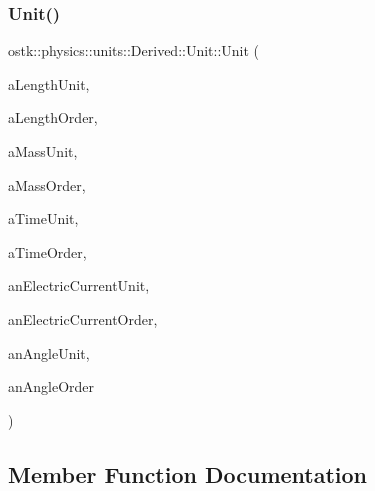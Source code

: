 \subsubsection{\texorpdfstring{Unit()}{Unit()}}
{\footnotesize\ttfamily ostk\+::physics\+::units\+::\+Derived\+::\+Unit\+::\+Unit (\begin{DoxyParamCaption}\item[{const \hyperlink{classostk_1_1physics_1_1units_1_1_length_a2664470a7eedf5d45c88861fe69badea}{Length\+::\+Unit} \&}]{a\+Length\+Unit,  }\item[{const \hyperlink{classostk_1_1physics_1_1units_1_1_derived_1_1_order}{Order} \&}]{a\+Length\+Order,  }\item[{const \hyperlink{classostk_1_1physics_1_1units_1_1_mass_aa8994892478fdbe6dc78d4bca08db0fa}{Mass\+::\+Unit} \&}]{a\+Mass\+Unit,  }\item[{const \hyperlink{classostk_1_1physics_1_1units_1_1_derived_1_1_order}{Order} \&}]{a\+Mass\+Order,  }\item[{const \hyperlink{classostk_1_1physics_1_1units_1_1_time_aa961f0dbca7ec297e19e15e0dfa3bb4a}{Time\+::\+Unit} \&}]{a\+Time\+Unit,  }\item[{const \hyperlink{classostk_1_1physics_1_1units_1_1_derived_1_1_order}{Order} \&}]{a\+Time\+Order,  }\item[{const \hyperlink{classostk_1_1physics_1_1units_1_1_electric_current_ac57c87a7533dc73b87185b0d9ae6985b}{Electric\+Current\+::\+Unit} \&}]{an\+Electric\+Current\+Unit,  }\item[{const \hyperlink{classostk_1_1physics_1_1units_1_1_derived_1_1_order}{Order} \&}]{an\+Electric\+Current\+Order,  }\item[{const \hyperlink{classostk_1_1physics_1_1units_1_1_angle_aea1f8018b1d378b9dee56959d8eb9def}{Angle\+::\+Unit} \&}]{an\+Angle\+Unit,  }\item[{const \hyperlink{classostk_1_1physics_1_1units_1_1_derived_1_1_order}{Order} \&}]{an\+Angle\+Order }\end{DoxyParamCaption})}



\subsection{Member Function Documentation}
\mbox{\label{classostk_1_1physics_1_1units_1_1_derived_1_1_unit_a930779ede3533f03279f5696f9b007b1}} 

